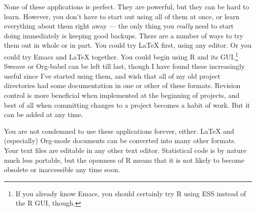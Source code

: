\documentclass[11pt,article,oneside]{memoir}
\begin{document}
None of these applications is perfect. They are powerful, but they can
be hard to learn. However, you don't have to start out using all of
them at once, or learn everything about them right away --- the only
thing you \emph{really} need to start doing immediately is keeping
good backups. There are a number of ways to try them out in whole or
in part. You could try \LaTeX{} first, using any editor. Or you could
try Emacs and \LaTeX{} together. You could begin using R and its
GUI.\footnote{If you already know Emacs, you should certainly try R
  using ESS instead of the R GUI, though. } Sweave or Org-babel can be
left till last, though I have found these increasingly useful since
I've started using them, and wish that all of my old project
directories had some documentation in one or other of these
formats. Revision control is more beneficial when implemented at the
beginning of projects, and best of all when committing changes to a
project becomes a habit of work. But it can be added at any time.

You are not condemned to use these applications forever, either. \LaTeX{}
and (especially) Org-mode documents can be converted into many other
formats. Your text files are editable in any other text
editor. Statistical code is by nature much less portable, but the
openness of R means that it is not likely to become obsolete or
inaccessible any time soon.
\end{document}
